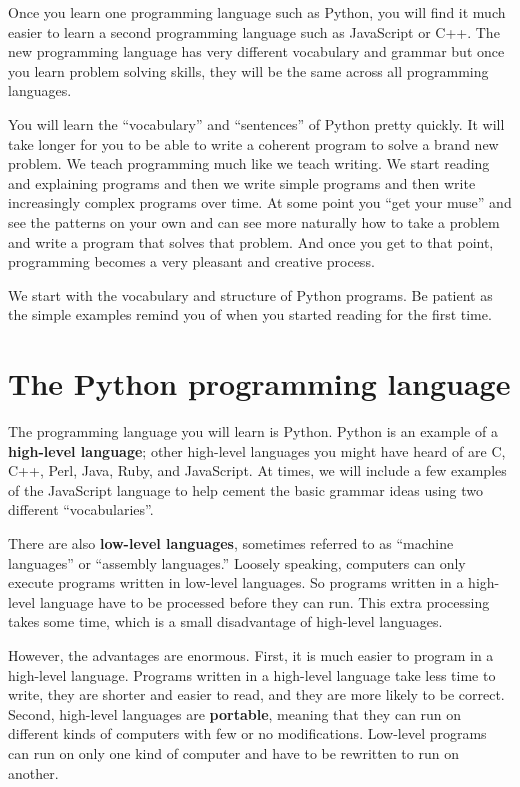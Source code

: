 \documentclass[10pt]{book}
\begin{document}
Once you learn one programming language such as Python, you will 
find it much easier to learn a second programming language such
as JavaScript or C++.  The new programming language has very different 
vocabulary and grammar but once you learn problem solving skills, 
they will be the same across all programming languages.

You will learn the ``vocabulary'' and ``sentences'' of Python pretty quickly.
It will take longer for you to be able to write a coherent program
to solve a brand new problem.  We teach programming much like we teach
writing.  We start reading and explaining programs and then we write 
simple programs and then write increasingly complex programs over time.
At some point you ``get your muse'' and see the patterns on your own
and can see more naturally how to take a problem and 
write a program that solves that problem.  And once you get 
to that point, programming becomes a very pleasant and creative process.  

We start with the vocabulary and structure of Python programs.  Be patient
as the simple examples remind you of when you started reading for the first
time. 

\section{The Python programming language}

The programming language you will learn is Python. Python is
an example of a {\bf high-level language}; other high-level languages
you might have heard of are C, C++, Perl, Java, Ruby, and JavaScript. 
At times, we will include a few examples of the JavaScript language
to help cement the basic grammar ideas using 
two different ``vocabularies''.

There are
also {\bf low-level languages}, sometimes referred to as ``machine
languages'' or ``assembly languages.''  Loosely speaking, computers
can only execute programs written in low-level languages.  So
programs written in a high-level language have to be processed before
they can run.  This extra processing takes some time, which is a small
disadvantage of high-level languages.


However, the advantages are enormous.  First, it is much easier to program
in a high-level language.  Programs written in a high-level language
take less time to write, they are shorter and easier to read, and they
are more likely to be correct.  Second, high-level languages are {\bf
portable}, meaning that they can run on different kinds of computers
with few or no modifications.  Low-level programs can run on only one
kind of computer and have to be rewritten to run on another.
\end{document}
